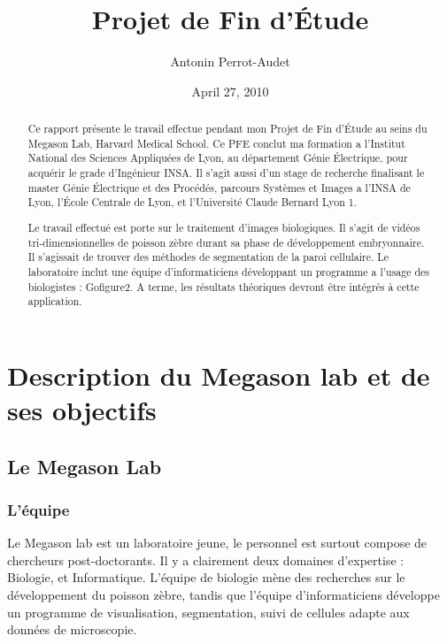 




\title{Projet de Fin d'Étude}   %
\author{Antonin Perrot-Audet}         %
\date{April 27, 2010}    %
\maketitle

\begin{abstract}
  Ce rapport présente le travail effectue pendant mon Projet de Fin d'Étude au seins du Megason Lab, Harvard Medical School. Ce PFE conclut ma formation a l'Institut National des Sciences Appliquées de Lyon, au département Génie Électrique, pour acquérir le grade d'Ingénieur INSA. Il s'agit aussi d'un stage de recherche finalisant le master Génie Électrique et des Procédés, parcours Systèmes et Images a l'INSA de Lyon, l'École Centrale de Lyon, et l'Université Claude Bernard Lyon 1.
  
  Le travail effectué est porte sur le traitement d'images biologiques. Il s'agit de vidéos tri-dimensionnelles de poisson zèbre durant sa phase de développement embryonnaire. Il s'agissait de trouver des méthodes de segmentation de la paroi cellulaire. Le laboratoire inclut une équipe d'informaticiens développant un programme a l'usage des biologistes : Gofigure2. A terme, les résultats théoriques devront être intégrés à cette application.
  
\end{abstract}



\chapter{Description du Megason lab et de ses objectifs} 

\section{Le Megason Lab}

\subsection{L'équipe}
Le Megason lab est un laboratoire jeune, le personnel est surtout compose de chercheurs post-doctorants. Il y a clairement deux domaines d'expertise : Biologie, et Informatique. L'équipe de biologie mène des recherches sur le développement du poisson zèbre, tandis que l'équipe d'informaticiens développe un programme de visualisation, segmentation, suivi de cellules adapte aux données de microscopie.


